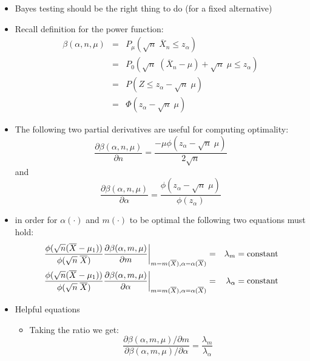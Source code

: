 \documentclass{article}
\begin{document}
\begin{itemize}
\item Bayes testing should be the right thing to do (for a fixed
alternative) 
\item Recall definition for the power function:
\begin{eqnarray}
\label{eq:beta}
\beta(\alpha,n,\mu) &=& P_\mu(\sqrt{n} \; \overline{X}_n \le
z_\alpha) \\ \nonumber
                    &=& P_0(\sqrt{n} \; (\overline{X}_n - \mu) +
\sqrt{n}\; \mu\le
z_\alpha) \\  \nonumber
                    &=& P(Z \le z_\alpha - \sqrt{n} \; \mu ) \\ \nonumber
                    &=& \Phi(z_\alpha - \sqrt{n} \; \mu ) 
\end{eqnarray}
\item The following two partial derivatives are useful for computing
optimality: 
\begin{equation}
\label{eq:partial:n}
\frac{\partial \beta(\alpha,n,\mu)}{\partial n}
 = \frac{-\mu \phi(z_\alpha - \sqrt{n} \; \mu)}{2\sqrt{n}}
\end{equation}
and
\begin{equation}
\label{eq:partial:alpha}
\frac{\partial \beta(\alpha,n,\mu)}{\partial \alpha} 
= \frac{\phi(z_\alpha - \sqrt{n} \; \mu)}{\phi(z_\alpha)}
\end{equation}
\item in order for $\alpha(\cdot)$ and $m(\cdot)$ to be optimal the
following two equations must hold:
\begin{eqnarray*}
\left.
\frac{\phi(\sqrt{n}(\overline{X} -
\mu_1))}{\phi(\sqrt{n}\;\overline{X})} 
\frac{\partial \beta(\alpha,m,\mu)}{\partial m}
\right|_{m = m(\overline{X}), \alpha = \alpha(\overline{X})}
& = & \lambda_m = \hbox{constant} \\
\left.
\frac{\phi(\sqrt{n}(\overline{X} -
\mu_1))}{\phi(\sqrt{n}\;\overline{X})} 
\frac{\partial \beta(\alpha,m,\mu)}{\partial \alpha}
\right|_{m = m(\overline{X}), \alpha = \alpha(\overline{X})}
& = & \lambda_\alpha = \hbox{constant} 
\end{eqnarray*}
\item Helpful equations
\begin{itemize}
\item Taking the ratio we get:
\begin{displaymath}
\frac{\partial \beta(\alpha,m,\mu)/\partial m}{\partial
\beta(\alpha,m,\mu)/\partial \alpha} = \frac{\lambda_m}{\lambda_\alpha}
\end{displaymath}

\end{itemize}
\end{itemize}
\end{document}
